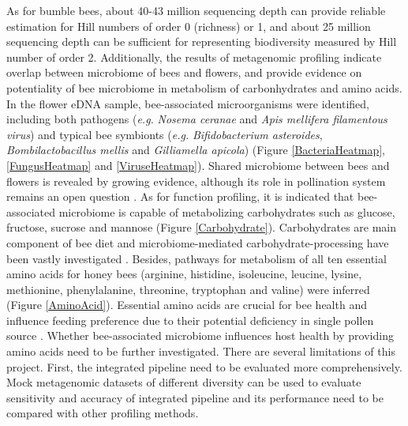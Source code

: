 \documentclass[11pt]{article}
\begin{document}
As for bumble bees, about 40-43 million sequencing depth can provide reliable estimation for Hill numbers of order 0 (richness) or 1, and about 25 million sequencing depth can be sufficient for representing biodiversity measured by Hill number of order 2.  
\newline
Additionally, the results of metagenomic profiling indicate overlap between microbiome of bees and flowers, and provide evidence on potentiality of bee microbiome in metabolism of carbonhydrates and amino acids.
In the flower eDNA sample, bee-associated microorganisms were identified, including both pathogens (\textit{e.g.} \textit{Nosema ceranae} and \textit{Apis mellifera filamentous virus}) and typical bee symbionts (\textit{e.g.} \textit{Bifidobacterium asteroides}, \textit{Bombilactobacillus mellis} and \textit{Gilliamella apicola}) (Figure \ref{BacteriaHeatmap}, \ref{FungusHeatmap} and \ref{ViruseHeatmap}). 
Shared microbiome between bees and flowers is revealed by growing evidence, although its role in pollination system remains an open question \citep{keller2020more,vannette2020floral}. 
As for function profiling, it is indicated that bee-associated microbiome is capable of metabolizing carbohydrates such as glucose, fructose, sucrose and mannose (Figure \ref{Carbohydrate}). 
Carbohydrates are main component of bee diet and microbiome-mediated carbohydrate-processing have been vastly investigated \citep{engel2012functional,lee2015saccharide,lee2018differential,taylor2019effect}. 
Besides, pathways for metabolism of all ten essential amino acids for honey bees (arginine, histidine, isoleucine, leucine, lysine, methionine, phenylalanine, threonine, tryptophan and valine) \citep{groot1953protein} were inferred (Figure \ref{AminoAcid}). 
Essential amino acids are crucial for bee health \citep{simcock2014single,paoli2014dietary,stabler2015nutrient,hendriksma2019effects} and influence feeding preference due to their potential deficiency in single pollen source \citep{cook2003honey,hendriksma2014amino,hendriksma2016honey}. 
Whether bee-associated microbiome influences host health by providing amino acids need to be further investigated. 
\newline
There are several limitations of this project. 
First, the integrated pipeline need to be evaluated more comprehensively. 
Mock metagenomic datasets of different diversity can be used to evaluate sensitivity and accuracy of integrated pipeline and its performance need to be compared with other profiling methods. 
\end{document}
